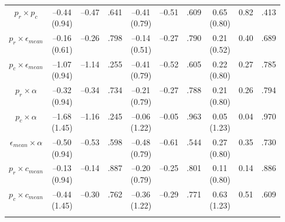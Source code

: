 \documentclass[
  11pt,
]{article}
\begin{document}
\begin{landscape}
\begin{ThreePartTable}
\begin{longtable}[t]{cccccccccc}
\addlinespace
$p_r \times p_c$ & \makecell[c]{–0.44\\(0.94)} & –0.47 & .641 & \makecell[c]{–0.41\\(0.79)} & –0.51 & .609 & \makecell[c]{0.65\\(0.80)} & 0.82 & .413\\
$p_r \times \epsilon_{mean}$ & \makecell[c]{–0.16\\(0.61)} & –0.26 & .798 & \makecell[c]{–0.14\\(0.51)} & –0.27 & .790 & \makecell[c]{0.21\\(0.52)} & 0.40 & .689\\
$p_c \times \epsilon_{mean}$ & \makecell[c]{–1.07\\(0.94)} & –1.14 & .255 & \makecell[c]{–0.41\\(0.79)} & –0.52 & .605 & \makecell[c]{0.22\\(0.80)} & 0.27 & .785\\
$p_r \times \alpha$ & \makecell[c]{–0.32\\(0.94)} & –0.34 & .734 & \makecell[c]{–0.21\\(0.79)} & –0.27 & .788 & \makecell[c]{0.21\\(0.80)} & 0.26 & .794\\
$p_c \times \alpha$ & \makecell[c]{–1.68\\(1.45)} & –1.16 & .245 & \makecell[c]{–0.06\\(1.22)} & –0.05 & .963 & \makecell[c]{0.05\\(1.23)} & 0.04 & .970\\
$\epsilon_{mean} \times \alpha$ & \makecell[c]{–0.50\\(0.94)} & –0.53 & .598 & \makecell[c]{–0.48\\(0.79)} & –0.61 & .544 & \makecell[c]{0.27\\(0.80)} & 0.35 & .730\\
$p_r \times c_{mean}$ & \makecell[c]{–0.13\\(0.94)} & –0.14 & .887 & \makecell[c]{–0.20\\(0.79)} & –0.25 & .801 & \makecell[c]{0.11\\(0.80)} & 0.14 & .886\\
$p_c \times c_{mean}$ & \makecell[c]{–0.44\\(1.45)} & –0.30 & .762 & \makecell[c]{–0.36\\(1.22)} & –0.29 & .771 & \makecell[c]{0.63\\(1.23)} & 0.51 & .609\\
\addlinespace


\end{longtable}
\end{ThreePartTable}
\end{landscape}
\end{document}
